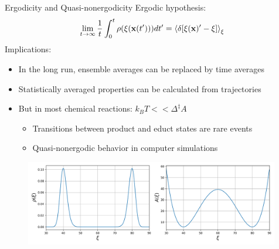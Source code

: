 \documentclass[10pt]{beamer}
\begin{document}
\begin{frame}{Ergodicity and Quasi-nonergodicity}
Ergodic hypothesis:
\begin{equation}
  \lim_{t\to\infty}\frac{1}{t} \int_0^t \rho(\xi(\textbf{x}(t'))) dt' = \braket{\delta [\xi(\textbf{x})'-\xi]}_\xi
\end{equation}
Implications:
\begin{itemize}
  \item In the long run, ensemble averages can be replaced by time averages\\
  \item Statistically averaged properties can be calculated from trajectories\\
  \item But in most chemical reactions: $k_B T << \Delta^\ddagger  A$\\
  \begin{itemize}
    \item Transitions between product and educt states are rare events\\
    \item Quasi-nonergodic behavior in computer simulations\\
  \end{itemize}
\end{itemize}

\begin{figure}[H]
    \centering
    \includegraphics[width=0.99\textwidth]{bilder/talk/PvsA}
\end{figure}
\end{frame}
\end{document}
